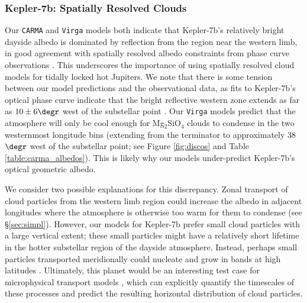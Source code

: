 \documentclass[twocolumn]{aastex63}
\begin{document}
\subsubsection{Kepler-7b: Spatially Resolved Clouds}\label{sec:k7}

Our \texttt{CARMA} and \texttt{Virga} models both indicate that Kepler-7b's relatively bright dayside albedo is dominated by reflection from the region near the western limb, in good agreement with spatially resolved albedo constraints from phase curve observations \citep{demory2013,heng2020}.  This underscores the importance of using spatially resolved cloud models for tidally locked hot Jupiters.  We note that there is some tension between our model predictions and the observational data, as fits to Kepler-7b's optical phase curve indicate that the bright reflective western zone extends as far as $10\pm6\degr$ west of the substellar point \textcolor{black}{\citep[][]{munoz2015, heng2020}}.  Our \texttt{Virga} models predict that the atmosphere will only be cool enough for Mg$_2$SiO$_4$ clouds to condense in the two westernmost longitude bins (extending from the terminator to approximately 38$\degr$ west of the substellar point; see Figure \ref{fig:discos} and Table \ref{table:carma_albedos}).  This is likely why our models under-predict Kepler-7b's optical geometric albedo.  

We consider two possible explanations for this discrepancy.  Zonal  transport of cloud particles from the western limb region could increase the albedo in adjacent longitudes where the atmosphere is otherwise too warm for them to condense (see \S\ref{sec:simpl}).  However, our models for Kepler-7b prefer small cloud particles with a large vertical extent; these small particles might have a relatively short lifetime in the hotter substellar region of the dayside atmosphere.  Instead, perhaps small particles transported meridionally could nucleate and grow in bands at high latitudes \citep{lines2018}.  Ultimately, this planet would be an interesting test case for microphysical transport models \citep[e.g.,][]{lee2015,lines2018}, which can explicitly quantify the timescales of these processes and predict the resulting horizontal distribution of cloud particles. 
\end{document}
